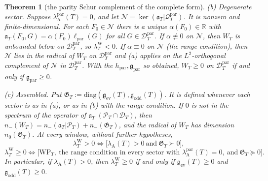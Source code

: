 \documentclass[11pt]{amsart}
\newtheorem{theorem}{Theorem}[section]
\theoremstyle{definition}
\theoremstyle{remark}
\newcommand{\R}{\mathbb R}
\newcommand{\PT}{\mathcal P_T}
\newcommand{\lamW}{\lambda^{\mathrm W}_T}
\newcommand{\lamA}{\lambda_{\mathrm A}(T)}
\begin{document}
\begin{theorem}[the parity Schur complement of the complete form]
\emph{(b) Degenerate sector.} Suppose $\lambda^{\mathrm{par}}_{\mathrm A}(T)=0$, and let
$\mathcal N=\ker(\mathfrak a_T|\mathcal Q^{\mathrm{par}}_T)$. It is nonzero and finite-dimensional. For each
$F_0\in\mathcal N$ there is a unique $\alpha(F_0)\in\R$ with $\mathfrak a_T(F_0,G)=\alpha(F_0)\ell_{\mathrm{par}}(G)$
for all $G\in\mathcal D^{\mathrm{par}}_T$. If $\alpha\not\equiv0$ on $\mathcal N$, then $W_T$ is unbounded below on
$\mathcal D^{\mathrm{par}}_T$, so $\lamW<0$. If $\alpha\equiv0$ on $\mathcal N$ (the \emph{range condition}), then
$\mathcal N$ lies in the radical of $W_T$ on $\mathcal D^{\mathrm{par}}_T$ and (a) applies on the $L^2$-orthogonal
complement of $\mathcal N$ in $\mathcal D^{\mathrm{par}}_T$. With the $h_{\mathrm{par}},\mathfrak g_{\mathrm{par}}$ so obtained,
$W_T\ge0$ on $\mathcal D^{\mathrm{par}}_T$ if and only if $\mathfrak g_{\mathrm{par}}\ge0$.

\emph{(c) Assembled.} Put $\mathfrak G_T:=\mathrm{diag}(\mathfrak g_{\mathrm{ev}}(T),\mathfrak g_{\mathrm{odd}}(T))$. It is
defined whenever each sector is as in (a), or as in (b) with the range condition. If $0$ is not in the
spectrum of the operator of $\mathfrak a_T|(\PT\cap\mathcal D_T)$, then
$n_-(W_T)=n_-(\mathfrak a_T|\PT)+n_-(\mathfrak G_T)$, and the radical of $W_T$ has dimension $n_0(\mathfrak G_T)$. At every window,
without further hypotheses,
\[
\lamW>0\iff\big[\lamA>0\ \text{and}\ \mathfrak G_T\succ0\big],
\]
\[
\lamW\ge0\iff\big[\mathrm{WP}_T,\ \text{the range condition in every sector with }
\lambda^{\mathrm{par}}_{\mathrm A}(T)=0,\ \text{and}\ \mathfrak G_T\succeq0\big].
\]
In particular, if $\lamA>0$, then $\lamW\ge0$ if and only if $\mathfrak g_{\mathrm{ev}}(T)\ge0$ and
$\mathfrak g_{\mathrm{odd}}(T)\ge0$.
\end{theorem}
\end{document}
